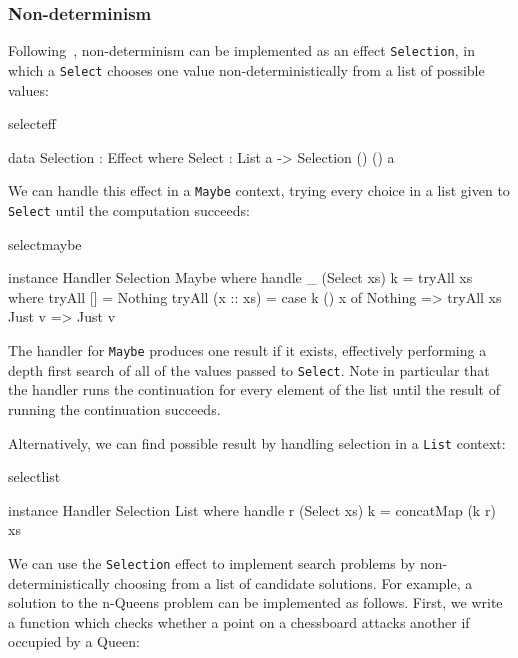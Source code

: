 \subsubsection{Non-determinism}

Following~\cite{Bauer},
non-determinism can be implemented as an effect \texttt{Selection},
in which a \texttt{Select} chooses one value non-deterministically
from a list of possible values:

\begin{SaveVerbatim}{selecteff}

data Selection : Effect where
     Select : List a -> Selection () () a

\end{SaveVerbatim}

\noindent
We can handle this effect in a \texttt{Maybe} context, trying every choice
in a list given to \texttt{Select} until the computation succeeds:

\begin{SaveVerbatim}{selectmaybe}

instance Handler Selection Maybe where
     handle _ (Select xs) k = tryAll xs where
         tryAll [] = Nothing
         tryAll (x :: xs) = case k () x of
                                 Nothing => tryAll xs
                                 Just v => Just v

\end{SaveVerbatim}

\noindent
The handler for \texttt{Maybe} produces one result if it exists, effectively
performing a depth first search of all of the values passed to \texttt{Select}.
Note in particular that the handler runs the continuation for every element
of the list until the result of running the continuation succeeds.

Alternatively, we can find  possible result by handling selection
in a \texttt{List} context:

\begin{SaveVerbatim}{selectlist}

instance Handler Selection List where
     handle r (Select xs) k = concatMap (k r) xs

\end{SaveVerbatim}

\noindent
We can use the \texttt{Selection} effect to implement search problems by
non-deterministically choosing from a list of candidate solutions. For example,
a solution to the n-Queens problem can be implemented as follows.
First, we write a function which checks whether a point on a chessboard
attacks another if occupied by a Queen:

